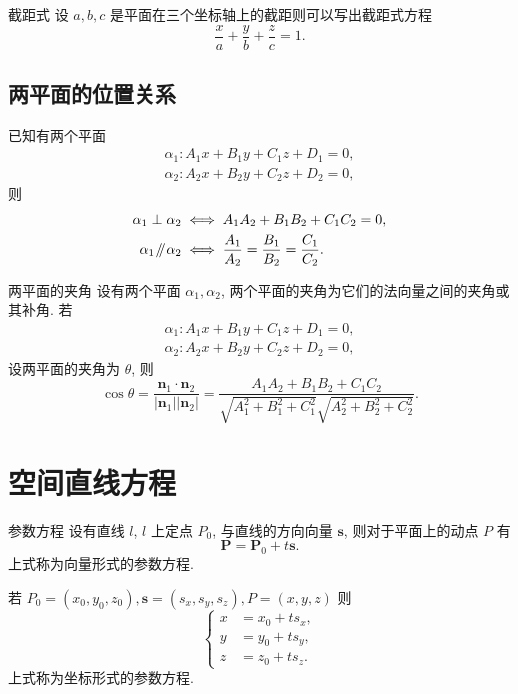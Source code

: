 \documentclass[cn,toc=twocol]{elegantbook}
\newcommand{\ve}[1]{\boldsymbol{#1}}
\newcommand{\parallelsum}{\mathbin{\!/\mkern-5mu/\!}}
\begin{document}
\begin{proposition}{截距式}
	设 $a, b, c$ 是平面在三个坐标轴上的截距则可以写出截距式方程
	\[
		\frac{x}{a} + \frac{y}{b} + \frac{z}{c} = 1.
	\]
\end{proposition}
\subsection{两平面的位置关系}

\begin{theorem}
	已知有两个平面
	\[
	\begin{aligned}
		\alpha_1 : A_1 x + B_1 y + C_1 z + D_1 =0,\\
		\alpha_2 : A_2 x + B_2 y + C_2 z + D_2 =0,
	\end{aligned}
	\]
	则
	\[
	\begin{aligned}
		\alpha_1 \perp \alpha_2 &\iff A_1 A_2 + B_1 B_2 + C_1 C_2 =0,\\
		\alpha_1 \parallelsum \alpha_2 &\iff \frac{A_1}{A_2} = \frac{B_1}{B_2} = \frac{C_1}{C_2}.
	\end{aligned}
	\]
\end{theorem}

\begin{definition}{两平面的夹角}
	设有两个平面 $\alpha_1, \alpha_2$, 两个平面的夹角为它们的法向量之间的夹角或其补角. 若
	\[
	\begin{aligned}
		\alpha_1 : A_1 x + B_1 y + C_1 z + D_1 =0,\\
		\alpha_2 : A_2 x + B_2 y + C_2 z + D_2 =0,
	\end{aligned}
	\]
	设两平面的夹角为 $\theta$, 则
	\[
		\cos \theta = \frac{\ve n_1 \cdot \ve n_2}{\lvert \ve n_1 \rvert \lvert \ve n_2 \rvert} = \frac{A_1 A_2 + B_1 B_2 + C_1 C_2}{\sqrt{A_1^2 + B_1^2 + C_1^2}\sqrt{A_2^2 + B_2^2 + C_2^2}}.
	\]
\end{definition}

\section{空间直线方程}

\begin{proposition}{参数方程}
	设有直线 $l$, $l$ 上定点 $P_0$, 与直线的方向向量 $\ve s$, 则对于平面上的动点 $P$ 有
	\[
		\ve P = \ve P_0 + t \ve s.
	\]
	上式称为向量形式的参数方程.
	
	若 $P_0 = (x_0, y_0, z_0), \ve s = (s_x, s_y, s_z), P = (x, y, z)$ 则
	\[
		\begin{cases}
			x &= x_0 + t s_x,\\
			y &= y_0 + t s_y,\\
			z &= z_0 + t s_z.
		\end{cases}
	\]
	上式称为坐标形式的参数方程.
\end{proposition}
\end{document}
